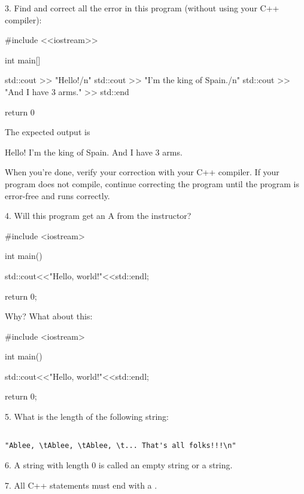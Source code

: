 3. Find and correct 
all the error in this program (without using your C++ compiler):
\begin{console}
#include <<iostream>>

int main[]
{
    std::cout >> "Hello!/n"
    std::cout >> "I’m the king of Spain./n"
    std::cout >> "And I have 3 arms." >> std::end

    return 0
}
\end{console}
The expected output is
\begin{console}
Hello!
I'm the king of Spain.
And I have 3 arms.
\end{console}
When you're done, verify your correction with your C++ compiler. 
If your program does not compile, continue correcting the program 
until the program is error-free and runs correctly.

4. Will this program get an A from the instructor?
\begin{console}
#include <iostream>

int main()
{
    std::cout<<"Hello, world!"<<std::endl;

    return 0;
}
\end{console}
Why? What about this:
\begin{console}
#include <iostream>

int main()
{


    std::cout<<"Hello, world!"<<std::endl;


    return 0;
}
\end{console}

5. What is the length of the following string:
\begin{verbatim}

"Ablee, \tAblee, \tAblee, \t... That's all folks!!!\n"

\end{verbatim}

6. A string with length 0 is called an empty string or a
   \underline{\mbox{}\hspace{1in}} string.

7. All C++ statements must end with a 
   \underline{\mbox{}\hspace{2in}}.
